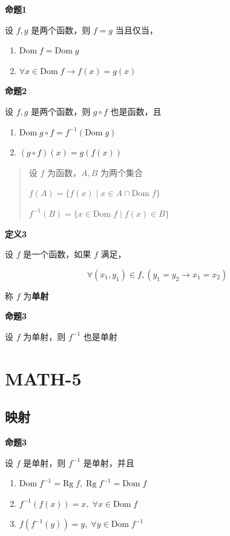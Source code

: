 \textbf{命题1}

设 \(f,g\) 是两个函数，则 \(f=g\) 当且仅当，

\begin{enumerate}
\def\labelenumi{\arabic{enumi}.}
\tightlist
\item
  \(\mathrm{Dom} \; f=\mathrm{Dom} \; g\)
\item
  \(\forall x \in \mathrm{Dom} \; f \to f(x)=g(x)\)
\end{enumerate}

\textbf{命题2}

设 \(f,g\) 是两个函数，则 \(g \circ f\) 也是函数，且

\begin{enumerate}
\def\labelenumi{\arabic{enumi}.}
\tightlist
\item
  \(\mathrm{Dom} \; g \circ f= f^{-1}(\mathrm{Dom} \; g)\)
\item
  \((g\circ f)(x)=g(f(x))\)
\end{enumerate}

\begin{quote}
设 \(f\) 为函数，\(A,B\) 为两个集合

\(f(A)=\{f(x)\mid x \in A \cap \mathrm{Dom} \; f\}\)

\(f^{-1}(B)=\{x\in \mathrm{Dom}\; f \mid f(x) \in B\}\)
\end{quote}

\textbf{定义3}

设 \(f\) 是一个函数，如果 \(f\) 满足，

\[
\forall (x_{1},y_{1})\in f, (y_{1}=y_{2}\to x_{1}=x_{2})
\]

称 \(f\) 为\textbf{单射}

\textbf{命题3}

设 \(f\) 为单射，则 \(f^{-1}\) 也是单射

\section{MATH-5}\label{math-5}

\subsection{映射}\label{ux6620ux5c04-1}

\textbf{命题3}

设 \(f\) 是单射，则 \(f^{-1}\) 是单射，并且

\begin{enumerate}
\def\labelenumi{\arabic{enumi}.}
\tightlist
\item
  \(\mathrm{Dom} \; f ^{-1}=\mathrm{Rg} \; f, \;\mathrm{Rg} \; f ^{-1}=\mathrm{Dom}\;f\)
\item
  \(f^{-1}(f(x))=x, \; \forall x \in \mathrm{Dom} \;f\)
\item
  \(f(f^{-1}(y))=y, \; \forall y \in \mathrm{Dom} \; f^{-1}\)
\end{enumerate}

